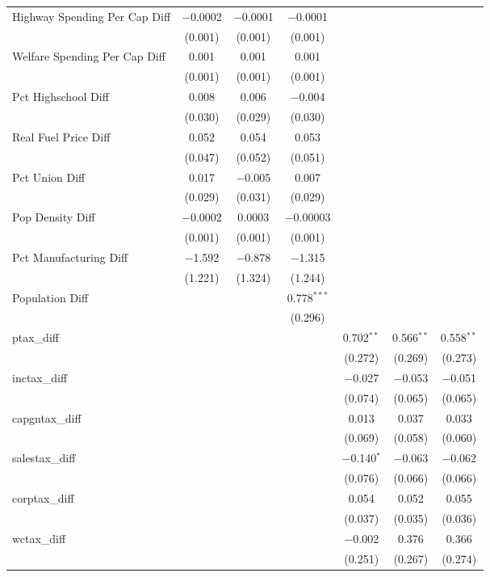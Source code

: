\begin{table}[!htbp]
\begin{tabular}{@{\extracolsep{5pt}}lcccccc}
  Highway Spending Per Cap Diff & $-$0.0002 & $-$0.0001 & $-$0.0001 &  &  &  \\ 
  & (0.001) & (0.001) & (0.001) &  &  &  \\ 
  Welfare Spending Per Cap Diff & 0.001 & 0.001 & 0.001 &  &  &  \\ 
  & (0.001) & (0.001) & (0.001) &  &  &  \\ 
  Pct Highschool Diff & 0.008 & 0.006 & $-$0.004 &  &  &  \\ 
  & (0.030) & (0.029) & (0.030) &  &  &  \\ 
  Real Fuel Price Diff & 0.052 & 0.054 & 0.053 &  &  &  \\ 
  & (0.047) & (0.052) & (0.051) &  &  &  \\ 
  Pct Union Diff & 0.017 & $-$0.005 & 0.007 &  &  &  \\ 
  & (0.029) & (0.031) & (0.029) &  &  &  \\ 
  Pop Density Diff & $-$0.0002 & 0.0003 & $-$0.00003 &  &  &  \\ 
  & (0.001) & (0.001) & (0.001) &  &  &  \\ 
  Pct Manufacturing Diff & $-$1.592 & $-$0.878 & $-$1.315 &  &  &  \\ 
  & (1.221) & (1.324) & (1.244) &  &  &  \\ 
  Population Diff &  &  & 0.778$^{***}$ &  &  &  \\ 
  &  &  & (0.296) &  &  &  \\ 
  ptax\_diff &  &  &  & 0.702$^{**}$ & 0.566$^{**}$ & 0.558$^{**}$ \\ 
  &  &  &  & (0.272) & (0.269) & (0.273) \\ 
  inctax\_diff &  &  &  & $-$0.027 & $-$0.053 & $-$0.051 \\ 
  &  &  &  & (0.074) & (0.065) & (0.065) \\ 
  capgntax\_diff &  &  &  & 0.013 & 0.037 & 0.033 \\ 
  &  &  &  & (0.069) & (0.058) & (0.060) \\ 
  salestax\_diff &  &  &  & $-$0.140$^{*}$ & $-$0.063 & $-$0.062 \\ 
  &  &  &  & (0.076) & (0.066) & (0.066) \\ 
  corptax\_diff &  &  &  & 0.054 & 0.052 & 0.055 \\ 
  &  &  &  & (0.037) & (0.035) & (0.036) \\ 
  wctax\_diff &  &  &  & $-$0.002 & 0.376 & 0.366 \\ 
  &  &  &  & (0.251) & (0.267) & (0.274) \\ 

\end{tabular}
\end{table}
